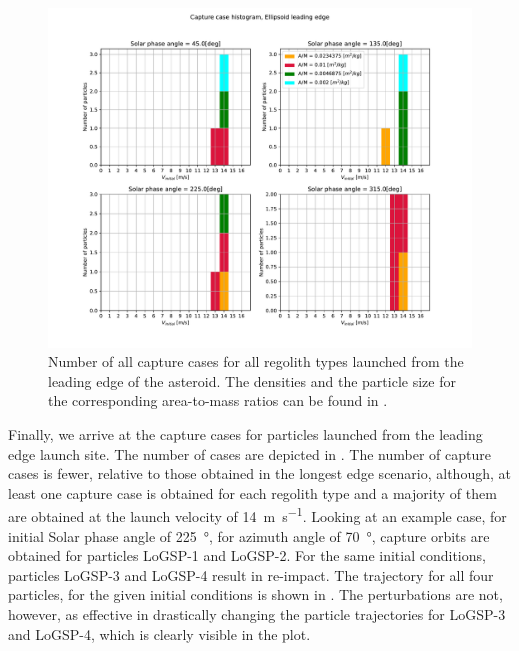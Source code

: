 \begin{figure}[htb]
\centering
\captionsetup{justification=centering}
\includegraphics[width=\textwidth, height=0.5\textheight, keepaspectratio=true]{leading_edge_perturbations/allCaptureCases.pdf}
\caption{Number of all capture cases for all regolith types launched from the leading edge of the asteroid. The densities and the particle size for the corresponding area-to-mass ratios can be found in .}
\label{fig:leadingEdge_allParticles_capture_hist}
\end{figure}
\FloatBarrier
Finally, we arrive at the capture cases for particles launched from the leading edge launch site. The number of cases are depicted in . The number of capture cases is fewer, relative to those obtained in the longest edge scenario, although, at least one capture case is obtained for each regolith type and a majority of them are obtained at the launch velocity of \SI{14}{\metre\per\second}. Looking at an example case, for initial Solar phase angle of \SI{225}{\degree}, for azimuth angle of \SI{70}{\degree}, capture orbits are obtained for particles LoGSP-1 and LoGSP-2. For the same initial conditions, particles LoGSP-3 and LoGSP-4 result in re-impact. The trajectory for all four particles, for the given initial conditions is shown in . The perturbations are not, however, as effective in drastically changing the particle trajectories for LoGSP-3 and LoGSP-4, which is clearly visible in the plot.
